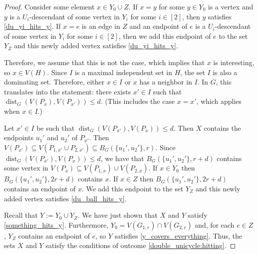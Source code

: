 \documentclass{patmorin}
\DeclareMathOperator{\dist}{dist}
\begin{document}
\begin{proof}
    Consider some element $x\in Y_0\cup Z$.  If $x=y$ for some $y\in Y_0$ is a vertex and $y$ is a $U_i$-descendant of some vertex in $Y_i$ for some $i\in[2]$, then $y$ satisfies \cref{du_yi_hits_y}.
    If $x=e$ is an edge in $Z$ and an endpoint of $e$ is  a $U_i$-descendant of some vertex in $Y_i$ for some $i\in[2]$, then we add this endpoint of $e$ to the set $Y_Z$ and this newly added vertex satisfies \cref{du_yi_hits_y}.

    Therefore, we assume that this is not the case, which implies that $x$ is interesting, so $x\in V(H)$.
    Since $I$ is a maximal independent set in $H$, the set $I$ is also a dominating set.
    Therefore, either $x\in I$ or $x$ has a neighbor in $I$.  In $G$, this translates into the statement:
    there exists $x'\in I$ such that $\dist_G(V(P_x),V(P_{x'}))\le d$.
    (This includes the case $x=x'$, which applies when $x\in I$.)

    Let $x'\in I$ be such that $\dist_G(V(P_{x'}),V(P_x))\le d$.  Then $X$ contains the endpoints $u_1'$ and $u_2'$ of $P_{x'}$.  Then $V(P_{x'})\subseteq V(P_{1,x'}\cup P_{2,x'})\subseteq B_G(\{u_1',u_2'\},r)$.  Since $\dist_G(V(P_{x'}),V(P_x))\le d$, we have that
    $B_G(\{u_1',u_2'\},r+d)$ contains some vertex in $V(P_x)\subseteq V(P_{1,x})\cup V(P_{2,x})$. If $x\in Y_0$ then $B_G(\{u_1',u_2'\},2r+d)$ contains $x$.  If $x\in Z$  then $B_G(\{u_1',u_2'\},2r+d)$ contains an endpoint of $x$.  We add this endpoint to the set $Y_Z$ and this newly added vertex satisfies \cref{du_ball_hits_y}.

    Recall that $Y:=Y_0\cup Y_Z$.  We have just shown that $X$ and $Y$ satisfy \cref{something_hits_y}.  Furthermore, $Y_0=V(G_{1,r})\cap V(G_{2,r})$ and, for each $e\in Z$, $Y_Z$ contains an endpoint of $e$, so $Y$ satisfies \cref{y_covers_everything}.  Thus, the sets $X$ and $Y$ satisfy the conditions of outcome \cref{double_unicycle:hitting}.
\end{proof}
\end{document}

